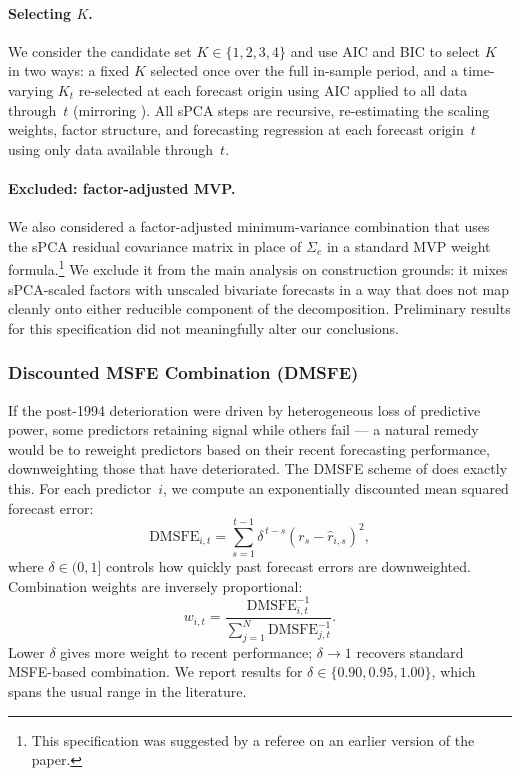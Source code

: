\documentclass[a4paper,11pt]{article}
\begin{document}
\paragraph{Selecting $K$.} We consider the candidate set
$K \in \{1,2,3,4\}$ and use AIC and BIC to select $K$ in two ways: a
fixed $K$ selected once over the full in-sample period, and a
time-varying $K_t$ re-selected at each forecast origin using AIC applied
to all data through~$t$ (mirroring \citealp{Ludvigson2005}). All sPCA
steps are recursive, re-estimating the scaling weights, factor structure,
and forecasting regression at each forecast origin~$t$ using only data
available through~$t$.

\paragraph{Excluded: factor-adjusted MVP.} We also considered a
factor-adjusted minimum-variance combination that uses the sPCA residual
covariance matrix in place of $\Sigma_e$ in a standard MVP weight
formula.\footnote{This specification was suggested by a referee on an
earlier version of the paper.} We exclude it from the main analysis on
construction grounds: it mixes sPCA-scaled factors with unscaled
bivariate forecasts in a way that does not map cleanly onto either
reducible component of the decomposition. Preliminary results for this
specification did not meaningfully alter our conclusions.

\subsubsection{Discounted MSFE Combination (DMSFE)}\label{subsubsec:dmsfe}

If the post-1994 deterioration were driven by heterogeneous loss of
predictive power, some predictors retaining signal while others fail
--- a natural remedy would be to reweight predictors based on their
recent forecasting performance, downweighting those that have
deteriorated. The DMSFE scheme of \citet{StockWatson2004} does exactly
this. For each predictor~$i$, we compute an exponentially discounted
mean squared forecast error:
\begin{equation}\label{eq:dmsfe}
    \mathrm{DMSFE}_{i,t}
    = \sum_{s=1}^{t-1} \delta^{\,t-s}
    \left(r_s - \hat{r}_{i,s}\right)^2,
\end{equation}
where $\delta \in (0,1]$ controls how quickly past forecast errors are
downweighted. Combination weights are inversely proportional:
\begin{equation}\label{eq:dmsfe-weights}
    w_{i,t}
    = \frac{\mathrm{DMSFE}_{i,t}^{-1}}
    {\sum_{j=1}^{N} \mathrm{DMSFE}_{j,t}^{-1}}.
\end{equation}
Lower $\delta$ gives more weight to recent performance;
$\delta \rightarrow 1$ recovers standard MSFE-based combination. We
report results for $\delta \in \{0.90, 0.95, 1.00\}$, which spans the
usual range in the literature.
\end{document}
